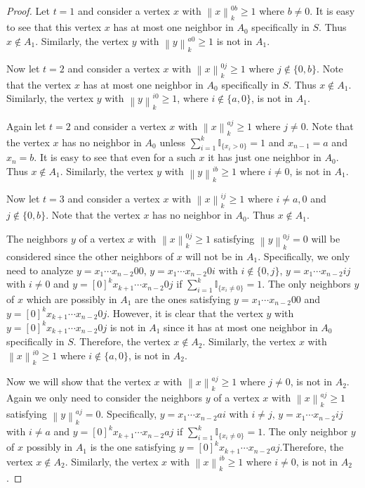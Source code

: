\documentclass[reqno,11pt]{amsart}
\renewcommand{\geq}{\geqslant}
\begin{document}
\begin{proof}
Let $t=1$ and consider a vertex $x$ with $ \left \lVert x \right \rVert_k^{0b}\geq 1$ where $b \neq 0$. It is easy to see that this vertex $x$ has at most one neighbor in $A_0$ specifically in $S$. Thus $x \notin A_1$. Similarly, the vertex $y$ with $\left \lVert y \right \rVert_k^{a0} \geq 1$ is not in $A_1$. 

Now let $t=2$ and consider a vertex $x$ with $ \left \lVert x \right \rVert_k^{0j}\geq 1$ where $j \notin \{0,b\}$. Note that the vertex $x$ has at most one neighbor in $A_0$ specifically in $S$. Thus $x \notin A_1$. Similarly, the vertex $y$ with $\left \lVert y \right \rVert_k^{i0} \geq 1$, where $i \notin \{a,0\}$, is not in $A_1$. 

Again let $t=2$ and consider a vertex $x$ with $ \left \lVert x \right \rVert_k^{aj}\geq 1$ where $j \neq 0$. Note that the vertex $x$ has no neighbor in $A_0$ unless $\sum_{i=1}^k\mathbb{I}_{\{x_i >0\}}=1$ and $x_{n-1}=a $ and $x_n=b$. It is easy to see that even for a such $x$ it has just one neighbor in $A_0$. Thus $x \notin A_1$. Similarly, the vertex $y$ with $\left \lVert y \right \rVert_k^{ib} \geq 1$ where $i \neq 0$, is not in $A_1$. 

Now let $t=3$ and consider a vertex $x$ with $ \left \lVert x \right \rVert_k^{ij}\geq 1$ where $i \neq a,0$ and $j \notin \{0,b\}$. Note that the vertex $x$ has no neighbor in $A_0$. Thus $x \notin A_1$.

The neighbors $y$ of a vertex $x$ with $\left \lVert x \right \rVert_k^{0j} \geq 1$ satisfying $\left \lVert y \right \rVert_k^{0j}=0$ will be considered since the other neighbors of $x$ will not be in $A_1$. Specifically, we only need to analyze $y=x_1\cdots x_{n-2}00$, $y=x_1\cdots x_{n-2}0i$ with $i \notin \{0,j\}$, $y=x_1\cdots x_{n-2}ij$ with $i \neq 0$ and $y=[0]^kx_{k+1}\cdots x_{n-2}0j$ if $\sum_{i=1}^k\mathbb{I}_{\{x_i \neq 0\}}=1$. The only neighbors $y$ of $x$ which are possibly in $A_1$ are the ones satisfying $y=x_1\cdots x_{n-2}00$ and $y=[0]^kx_{k+1}\cdots x_{n-2}0j$. However, it is clear that the vertex $y$ with $y=[0]^kx_{k+1}\cdots x_{n-2}0j$ is not in $A_1$ since it has at most one neighbor in $A_0$ specifically in $S$. Therefore, the vertex $x \notin A_2$. Similarly, the vertex $x$ with $\left \lVert x \right \rVert_k^{i0} \geq 1$ where $i \notin \{a,0\}$, is not in $A_2$. 

Now we will show that the vertex $x$ with $\left \lVert x \right \rVert_k^{aj} \geq 1$ where $j \neq 0$, is not in $A_2$. Again we only need to consider the neighbors $y$ of a vertex $x$ with $\left \lVert x \right \rVert_k^{aj} \geq 1$ satisfying $\left \lVert y \right \rVert_k^{aj}=0$. Specifically, $y=x_1\cdots x_{n-2}ai$ with $i \neq j$, $y=x_1\cdots x_{n-2}ij$ with $i \neq a$ and $y=[0]^kx_{k+1}\cdots x_{n-2}aj$ if $\sum_{i=1}^k\mathbb{I}_{\{x_i \neq 0\}}=1$. The only neighbor $y$ of $x$ possibly in $A_1$ is the one satisfying $y=[0]^kx_{k+1}\cdots x_{n-2}aj$.Therefore, the vertex $x \notin A_2$. Similarly, the vertex $x$ with $\left \lVert x \right \rVert_k^{ib} \geq 1$ where $i \neq 0$, is not in $A_2$. 


\end{proof}
\end{document}
